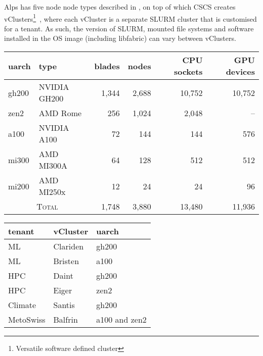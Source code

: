 Alps has five node node types described in , on top of which CSCS creates vClusters\footnote{Versatile software defined cluster}~\cite{vClusters2023}, where each vCluster is a separate SLURM cluster that is customised for a tenant.
As such, the version of SLURM, mounted file systems and software installed in the OS image (including libfabric) can vary between vClusters.

\begin{table*}[!htb]
    \begin{minipage}{0.6\textwidth}
        \centering
        \begin{tabular}{llrrrr}
        \toprule
        uarch   & type         & blades & nodes & CPU sockets & GPU devices \\
        \midrule
        gh200   & NVIDIA GH200 & 1,344   & 2,688  & 10,752      & 10,752      \\
        zen2    & AMD Rome     & 256     & 1,024  & 2,048       & --          \\
        a100    & NVIDIA A100  & 72      & 144    & 144         & 576         \\
        mi300   & AMD MI300A   & 64      & 128    & 512         & 512         \\
        mi200   & AMD MI250x   & 12      & 24     & 24          & 96          \\
        \midrule
        \multicolumn{2}{c}{\textsc{Total}}      & 1,748   & 3,880  & 13,480  & 11,936 \\
        \bottomrule
        \end{tabular}
    \end{minipage}%
    \begin{minipage}{0.4\textwidth}
        \centering
        \begin{tabular}{lll}
        \toprule
        tenant   & vCluster & uarch         \\
        \midrule
            ML      & Clariden & gh200 \\
            ML      & Bristen  & a100 \\
            HPC     & Daint    & gh200 \\
            HPC     & Eiger    & zen2 \\
            Climate & Santis   & gh200  \\
            MetoSwiss & Balfrin   & a100 and zen2  \\
        \bottomrule
        \end{tabular}
    \end{minipage}
    \caption{Alps node types and their specifications (left), and examples of vClusters provided to tenants (right).}
\label{tab:alps-nodes}
\end{table*}

